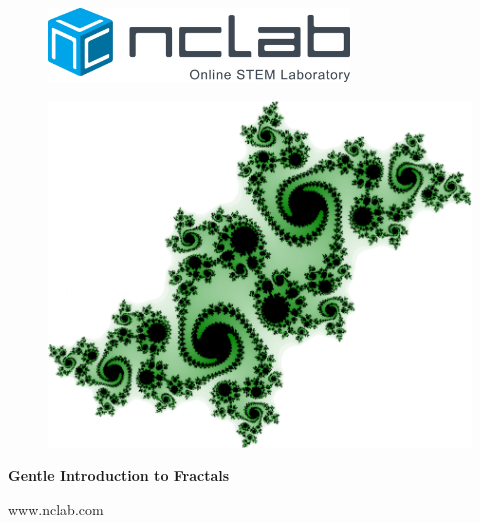 \documentclass{article}
\begin{document}
\large

\vbox{}
\begin{figure}[!ht]
\includegraphics[width=8cm]{img/logo.png}
\vspace{6mm}
\end{figure}

\begin{figure}[!ht]
\begin{center}
\includegraphics[width=16cm]{img/fractals-frontpage.png}
\vspace{8mm}
\end{center}
\end{figure}

\centerline{\Huge \bf Gentle Introduction to Fractals}

\vfill

\centerline{\Large www.nclab.com}

\newpage




\section*{}
\small

\end{document}
